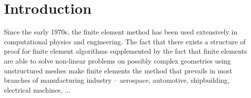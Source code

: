 \documentclass{article}
\theoremstyle{remark}
\newcommand{\todo}[1]{{\color{red}TODO: #1}}
\begin{document}
\section{Introduction}

Since the early 1970s, the finite element method has been used extensively in  computational physics and engineering.
The fact that there exists a structure of proof for finite element algorithms \cite{ern2004theory} supplemented by the fact that finite elements are able to solve non-linear problems \cite{wriggers2008nonlinear} on possibly complex geometries using unstructured meshes \cite{geuzaine2009gmsh}
make finite elements the method that prevails in most branches of manufacturing industry -- aerospace, automotive, shipbuilding, electrical machines, ...  
\end{document}
